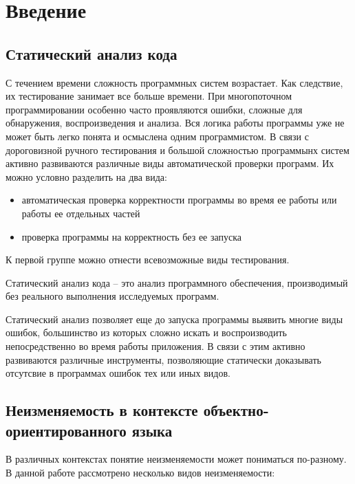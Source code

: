 \chapter{Введение}

\section{Статический анализ кода}

С течением времени сложность программных систем возрастает. Как следствие, их тестирование занимает все больше времени. При многопоточном программировании особенно часто проявляются ошибки, сложные для обнаружения, воспроизведения и анализа. Вся логика работы программы уже не может быть легко понята и осмыслена одним программистом. В связи с дороговизной ручного тестирования и большой сложностью программынх систем активно развиваются различные виды автоматической проверки программ. Их можно условно разделить на два вида:
\begin{itemize}
\item автоматическая проверка корректности программы во время ее работы или работы ее отдельных частей
\item проверка программы на корректность без ее запуска
\end{itemize}

К первой группе можно отнести всевозможные виды тестирования. 

\begin{Def}\label{static_program_analysis}
Статический анализ кода -- это анализ программного обеспечения, производимый без реального выполнения исследуемых программ.
\end{Def}

Статический анализ позволяет еще до запуска программы выявить многие виды ошибок, большинство из которых сложно искать и воспроизводить непосредственно во время работы приложения. В связи с этим активно развиваются различные инструменты, позволяющие статически доказывать отсутсвие в программах ошибок тех или иных видов.  



\section{Неизменяемость в контексте объектно-ориентированного языка}

В различных контекстах понятие неизменяемости может пониматься по-разному. В данной работе рассмотрено несколько видов неизменяемости:

